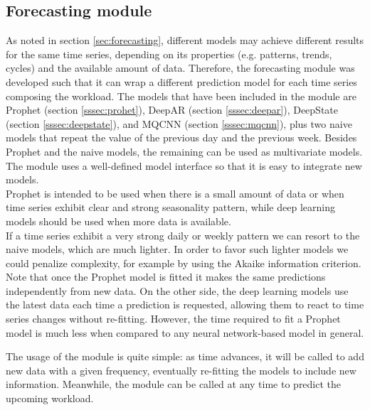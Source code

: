 \documentclass[a4paper, 12pt]{article} %
\begin{document}
	\subsection{Forecasting module} \label{ssec:forecasting_module}
	As noted in section \ref{sec:forecasting}, different models may achieve different results for the same time series, depending on its properties (e.g. patterns, trends, cycles) and the available amount of data. Therefore, the forecasting module was developed such that it can wrap a different prediction model for each time series composing the workload.
	The models that have been included in the module are Prophet (section \ref{sssec:prohet}), DeepAR (section \ref{sssec:deepar}), DeepState (section \ref{sssec:deepstate}), and MQCNN (section \ref{sssec:mqcnn}), plus two naive models that repeat the value of the previous day and the previous week. Besides Prophet and the naive models, the remaining can be used as multivariate models. The module uses a well-defined model interface so that it is easy to integrate new models.\\
	Prophet is intended to be used when there is a small amount of data or when time series exhibit clear and strong seasonality pattern, while deep learning models should be used when more data is available.\\
	If a time series exhibit a very strong daily or weekly pattern we can resort to the naive models, which are much lighter. In order to favor such lighter models we could penalize complexity, for example by using the Akaike information criterion. \\
	Note that once the Prophet model is fitted it makes the same predictions independently from new data. On the other side, the deep learning models use the latest data each time a prediction is requested, allowing them to react to time series changes without re-fitting. However, the time required to fit a Prophet model is much less when compared to any neural network-based model in general.
	
	The usage of the module is quite simple: as time advances, it will be called to add new data with a given frequency, eventually re-fitting the models to include new information. Meanwhile, the module can be called at any time to predict the upcoming workload. 
	
\end{document}
